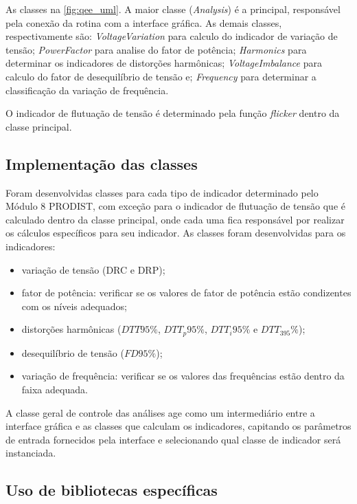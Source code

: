 As classes na \autoref{fig:qee_uml}. A maior classe (\textit{Analysis}) é a principal, responsável pela conexão da rotina com a interface gráfica. As demais classes, respectivamente são: \textit{VoltageVariation} para calculo do indicador de variação de tensão; \textit{PowerFactor} para analise do fator de potência; \textit{Harmonics} para determinar os indicadores de distorções harmônicas; \textit{VoltageImbalance} para calculo do fator de desequilíbrio de tensão e; \textit{Frequency} para determinar a classificação da variação de frequência.

O indicador de flutuação de tensão é determinado pela função \textit{flicker} dentro da classe principal.

\subsection{Implementação das classes}

Foram desenvolvidas classes para cada tipo de indicador determinado pelo Módulo 8 PRODIST, com exceção para o indicador de flutuação de tensão que é calculado dentro da classe principal, onde cada uma fica responsável por realizar os cálculos específicos para seu indicador. As classes foram desenvolvidas para os indicadores:

\begin{itemize}
  \item variação de tensão (DRC e DRP);
  \item fator de potência: verificar se os valores de fator de potência estão condizentes com os níveis adequados;
  \item distorções harmônicas ($DTT95\%$, $DTT_p95\%$, $DTT_i95\%$ e $DTT_395\%$);
  \item desequilíbrio de tensão ($FD95\%$);
  \item variação de frequência: verificar se os valores das frequências estão dentro da faixa adequada.
\end{itemize}

A classe geral de controle das análises age como um intermediário entre a interface gráfica e as classes que calculam os indicadores, capitando os parâmetros de entrada fornecidos pela interface e selecionando qual classe de indicador será instanciada.

\subsection{Uso de bibliotecas específicas}

